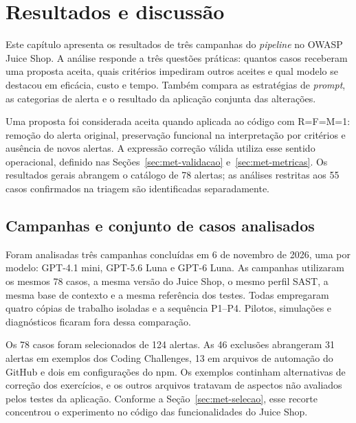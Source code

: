 
\chapter{Resultados e discussão}

\label{cap:resultados}

Este capítulo apresenta os resultados de três campanhas do \textit{pipeline} no OWASP Juice Shop. A análise responde a três questões práticas: quantos casos receberam uma proposta aceita, quais critérios impediram outros aceites e qual modelo se destacou em eficácia, custo e tempo. Também compara as estratégias de \textit{prompt}, as categorias de alerta e o resultado da aplicação conjunta das alterações.

Uma proposta foi considerada aceita quando aplicada ao código com R=F=M=1: remoção do alerta original, preservação funcional na interpretação por critérios e ausência de novos alertas. A expressão correção válida utiliza esse sentido operacional, definido nas Seções~\ref{sec:met-validacao} e~\ref{sec:met-metricas}. Os resultados gerais abrangem o catálogo de 78 alertas; as análises restritas aos 55 casos confirmados na triagem são identificadas separadamente.

\section{Campanhas e conjunto de casos analisados}

\label{sec:res-campanhas}

Foram analisadas três campanhas concluídas em 6 de novembro de 2026, uma por modelo: GPT-4.1 mini, GPT-5.6 Luna e GPT-6 Luna. As campanhas utilizaram os mesmos 78 casos, a mesma versão do Juice Shop, o mesmo perfil SAST, a mesma base de contexto e a mesma referência dos testes. Todas empregaram quatro cópias de trabalho isoladas e a sequência P1--P4. Pilotos, simulações e diagnósticos ficaram fora dessa comparação.

Os 78 casos foram selecionados de 124 alertas. As 46 exclusões abrangeram 31 alertas em exemplos dos Coding Challenges, 13 em arquivos de automação do GitHub e dois em configurações do npm. Os exemplos continham alternativas de correção dos exercícios, e os outros arquivos tratavam de aspectos não avaliados pelos testes da aplicação. Conforme a Seção~\ref{sec:met-selecao}, esse recorte concentrou o experimento no código das funcionalidades do Juice Shop.

